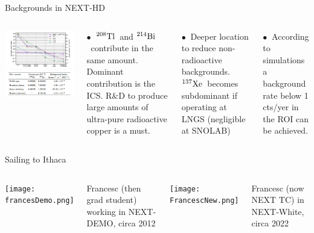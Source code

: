 \documentclass [aspectratio=169]{beamer}
\newcommand{\XES}{\ensuremath{{}^{137}{\rm Xe}}}
\newcommand{\TL}{\ensuremath{{}^{208}{\rm Tl}}}
\newcommand{\BI}{\ensuremath{{}^{214}{\rm Bi}}}
\begin{document}
\begin{frame}{Backgrounds in NEXT-HD}
\begin{columns}
\includegraphics[scale=0.40]{bkgndHD.png}
\includegraphics[scale=0.40]{RadioHD.png}



$\bullet~$ \TL\ and \BI\ contribute in the same amount. Dominant contribution is the ICS. R\&D to produce large amounts of ultra-pure radioactive copper is a must. 

$\bullet~$ Deeper location to reduce non-radioactive backgrounds. \XES\ becomes subdominant if operating at LNGS (negligible at SNOLAB) 

$\bullet~$ According to simulations a background rate below 1 cts/yer in the ROI can be achieved. 

\end{columns}
\end{frame}





\begin{frame}{Sailing to Ithaca}
\begin{columns}
\texttt{[image: francesDemo.png]}

Francesc (then grad student) working in NEXT-DEMO, circa 2012

\texttt{[image: FrancescNew.png]}

Francesc (now NEXT TC) in NEXT-White, circa 2022
 
 \end{columns}
\end{frame}









\end{document}
